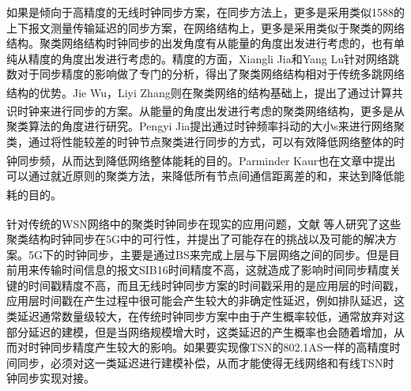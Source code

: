 \documentclass[UTF8,a4paper,12pt]{ctexart}
\numberwithin{equation}{section}
\begin{document}
如果是倾向于高精度的无线时钟同步方案，在同步方法上，更多是采用类似1588的上下报文测量传输延迟的同步方案，在网络结构上，更多是采用类似于聚类的网络结构。聚类网络结构时钟同步的出发角度有从能量的角度出发进行考虑的，也有单纯从精度的角度出发进行考虑的。精度的方面，Xiangli Jia和Yang Lu针对网络跳数对于同步精度的影响做了专门的分析，得出了聚类网络结构相对于传统多跳网络结构的优势\textsuperscript{\cite{jia2019improved}}。Jie Wu，Liyi Zhang则在聚类网络的结构基础上，提出了通过计算共识时钟来进行同步的方案\textsuperscript{\cite{wu2014cluster}}。从能量的角度出发进行考虑的聚类网络结构，更多是从聚类算法的角度进行研究。Pengyi Jia提出通过时钟频率抖动的大小s来进行网络聚类，通过将性能较差的时钟节点聚类进行同步的方式，可以有效降低网络整体的时钟同步频，从而达到降低网络整体能耗的目的\textsuperscript{\cite{jia2019distributed}}。Parminder Kaur也在文章中提出可以通过就近原则的聚类方法，来降低所有节点间通信距离差的和，来达到降低能耗的目的\textsuperscript{\cite{kaur2015energy}}。


针对传统的WSN网络中的聚类时钟同步在现实的应用问题，文献\textsuperscript{\cite{lee2011accuracy}}  等人研究了这些聚类结构时钟同步在5G中的可行性，并提出了可能存在的挑战以及可能的解决方案。5G下的时钟同步，主要是通过BS来完成上层与下层网络之间的同步。但是目前用来传输时间信息的报文SIB16时间精度不高，这就造成了影响时间同步精度关键的时间戳精度不高，而且无线时钟同步方案的时间戳采用的是应用层的时间戳，应用层时间戳在产生过程中很可能会产生较大的非确定性延迟，例如排队延迟，这类延迟通常数量级较大，在传统时钟同步方案中由于产生概率较低，通常放弃对这部分延迟的建模，但是当网络规模增大时，这类延迟的产生概率也会随着增加，从而对时钟同步精度产生较大的影响。如果要实现像TSN的802.1AS一样的高精度时间同步，必须对这一类延迟进行建模补偿，从而才能使得无线网络和有线TSN时钟同步实现对接。 
\end{document}
